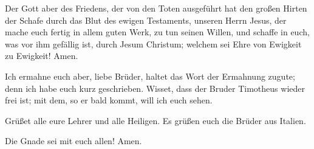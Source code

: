  Der Gott aber des Friedens, der von den Toten ausgeführt
hat den großen Hirten der Schafe durch das Blut des ewigen Testaments,
unseren Herrn Jesus,  der mache euch fertig in allem
guten Werk, zu tun seinen Willen, und schaffe in euch, was vor ihm
gefällig ist, durch Jesum Christum; welchem sei Ehre von Ewigkeit zu
Ewigkeit! Amen.

 Ich ermahne euch aber, liebe Brüder, haltet das Wort der
Ermahnung zugute; denn ich habe euch kurz geschrieben. 
Wisset, dass der Bruder Timotheus wieder frei ist; mit dem, so er bald
kommt, will ich euch sehen.

 Grüßet alle eure Lehrer und alle Heiligen. Es grüßen
euch die Brüder aus Italien.

 Die Gnade sei mit euch allen! Amen.
